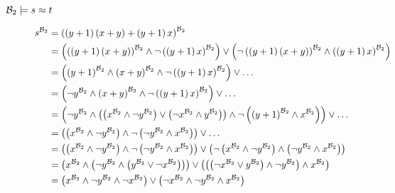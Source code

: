 	\begin{description}
		\item[${\mathcal{B}_2}\models s\approx t$] 
		\begin{align*}
			s^\BTwo & =\left( \left( y+1\right)\left( x+y\right)+\left( y+1\right)x\right)^\BTwo                                                                                                                                                                          \\
			        & =\left( \left( \left( y+1\right)\left( x+y\right)\right)^{\BTwo}\wedge \neg \left( \left( y+1\right)x\right)^\BTwo\right)\vee\left( \neg \left( \left( y+1\right)\left( x+y\right)\right)^\BTwo\wedge \left( \left( y+1\right)x\right)^\BTwo\right) \\
			        & =\left( \left( y+1\right)^\BTwo\wedge\left( x+y\right)^\BTwo\wedge \neg \left( \left( y+1\right)x\right)^\BTwo\right)\vee\dots                                                                                                                      \\
			        & =\left( \neg y^\BTwo\wedge\left( x+y\right)^\BTwo\wedge \neg \left( \left( y+1\right)x\right)^\BTwo\right)\vee\dots                                                                                                                                 \\
			        & =\left( \neg y^\BTwo\wedge\left( \left( x^\BTwo\wedge\neg y^\BTwo\right)\vee\left( \neg x^\BTwo\wedge y^\BTwo\right)\right)\wedge \neg \left( \left( y+1\right)^\BTwo\wedge x^\BTwo\right)\right)\vee\dots                                          \\
			        & =\left( \left( x^\BTwo\wedge\neg y^\BTwo\right)\wedge \neg \left( \neg y^\BTwo\wedge x^\BTwo\right)\right)\vee\dots                                                                                                                                 \\
			        & =\left( \left( x^\BTwo\wedge\neg y^\BTwo\right)\wedge \neg \left( \neg y^\BTwo\wedge x^\BTwo\right)\right)\vee\left( \neg\left( x^\BTwo\wedge\neg y^\BTwo\right)\wedge \left( \neg y^\BTwo\wedge x^\BTwo\right)\right)                              \\
			        & =\left( x^\BTwo\wedge\left( \neg y^\BTwo\wedge \left( y^\BTwo\vee\neg x^\BTwo\right)\right)\right)\vee\left( \left( \left( \neg x^\BTwo\vee y^\BTwo\right)\wedge \neg y^\BTwo\right)\wedge x^\BTwo\right)                                           \\
			        & =\left( x^\BTwo\wedge\neg y^\BTwo\wedge \neg x^\BTwo\right)\vee\left( \neg x^\BTwo\wedge \neg y^\BTwo\wedge x^\BTwo\right)                                                                                                                          \\

\end{align*}
\end{description}
